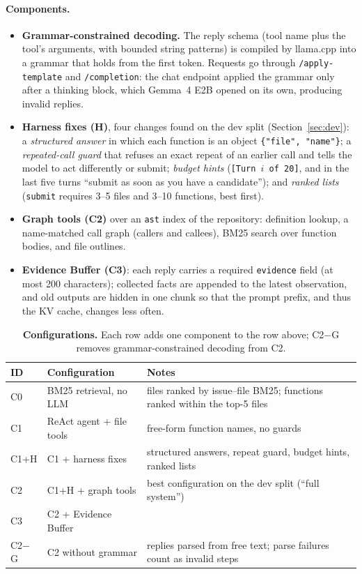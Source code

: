 \documentclass[11pt]{article}
\newcommand{\Gm}{Gemma~4 E2B}
\begin{document}
\paragraph{Components.}
\begin{itemize}
\item \textbf{Grammar-constrained decoding.} The reply schema (tool name plus the tool's arguments, with bounded string patterns) is compiled by llama.cpp into a grammar that holds from the first token. Requests go through \texttt{/apply-template} and \texttt{/completion}: the chat endpoint applied the grammar only after a thinking block, which \Gm{} opened on its own, producing invalid replies.
\item \textbf{Harness fixes (H)}, four changes found on the dev split (Section~\ref{sec:dev}): a \emph{structured answer} in which each function is an object \texttt{\{"file", "name"\}}; a \emph{repeated-call guard} that refuses an exact repeat of an earlier call and tells the model to act differently or submit; \emph{budget hints} (\texttt{[Turn $i$ of 20]}, and in the last five turns ``submit as soon as you have a candidate''); and \emph{ranked lists} (\texttt{submit} requires 3--5 files and 3--10 functions, best first).
\item \textbf{Graph tools (C2)} over an \texttt{ast} index of the repository: definition lookup, a name-matched call graph (callers and callees), BM25 search over function bodies, and file outlines.
\item \textbf{Evidence Buffer (C3)}: each reply carries a required \texttt{evidence} field (at most 200 characters); collected facts are appended to the latest observation, and old outputs are hidden in one chunk so that the prompt prefix, and thus the KV cache, changes less often.
\end{itemize}

\begin{table}[t]
\centering
\small
\caption{\textbf{Configurations.} Each row adds one component to the row above; C2$-$G removes grammar-constrained decoding from C2.}
\label{tab:configs}
\begin{tabular}{lll}
\toprule
ID & Configuration & Notes \\
\midrule
C0 & BM25 retrieval, no LLM & files ranked by issue--file BM25; functions ranked within the top-5 files \\
C1 & ReAct agent + file tools & free-form function names, no guards \\
C1+H & C1 + harness fixes & structured answers, repeat guard, budget hints, ranked lists \\
C2 & C1+H + graph tools & best configuration on the dev split (``full system'') \\
C3 & C2 + Evidence Buffer & \\
C2$-$G & C2 without grammar & replies parsed from free text; parse failures count as invalid steps \\
\bottomrule
\end{tabular}
\end{table}
\end{document}
